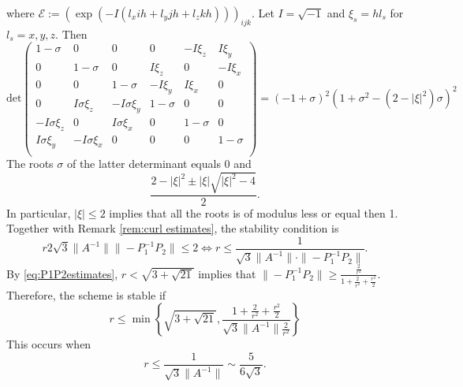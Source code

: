 \documentclass[12pt,reqno]{amsart}
\newtheorem{rem}[theorem]{Remark}
\theoremstyle{definition}
\numberwithin{equation}{section}
\begin{document}
where
 $\mathcal{E}:=(\exp(-I(l_xih+l_yjh+l_zkh)))_{ijk}$.
Let $I=\sqrt{-1}$ and $\xi_s=hl_s$ for $l_s=x,y,z$.
Then
$$
\mathrm{det}
\begin{pmatrix}
	1-\sigma&0&0&0&-I\xi_z&I\xi_y\\
	0&1-\sigma&0&I\xi_z&0&-I\xi_x\\
	0&0&1-\sigma&-I\xi_y&I\xi_x&0\\
	0&I\sigma \xi_z&-I\sigma \xi_y&1	-\sigma&0&0\\
-I\sigma \xi_z&0&I\sigma \xi_x	&0&1-\sigma&0\\
	I\sigma  \xi_y&-I\sigma \xi_x&0&0&0&1-\sigma\\
\end{pmatrix}
=
(-1 + \sigma)^2(1 + \sigma^2 - (2-|\xi|^2 )\sigma)^2
$$
The roots $\sigma$ of the latter determinant equals $0$ and 
$$
\frac{2-|\xi|^2\pm|\xi|\sqrt{|\xi|^2-4}}{2}.
$$
In particular, $|\xi|\leq 2$ implies that all the roots is of modulus less or equal then 1.
Together with  Remark \ref{rem:curl estimates},  the stability condition is 
$$
r2\sqrt{3}\|A^{-1}\| \|-P_1^{-1}P_2\|\leq 2 \Leftrightarrow
r\leq \frac{1}{\sqrt{3}\|A^{-1}\|\cdot \|-P_1^{-1}P_2\|}.
$$
By \eqref{eq:P1P2estimates}, $r<\sqrt{3+\sqrt{21}}$ implies that $\|-P_1^{-1}P_2\|\geq \frac{\frac{2}{r^2}}{1+\frac{2}{r^2}+\frac{r^2}{2}}$.
Therefore, the scheme is stable if 
$$
r\leq\min\left \{
\sqrt{3+\sqrt{21}}, \frac{1+\frac{2}{r^2}+\frac{r^2}{2}}{\sqrt{3}\|A^{-1}\|\frac{2}{r^2}}
\right \}
$$
This occurs when 
$$
r\leq \frac{1}{\sqrt{3}\|A^{-1}\|}\sim\frac{5}{6\sqrt{3}}.
$$
\end{document}
